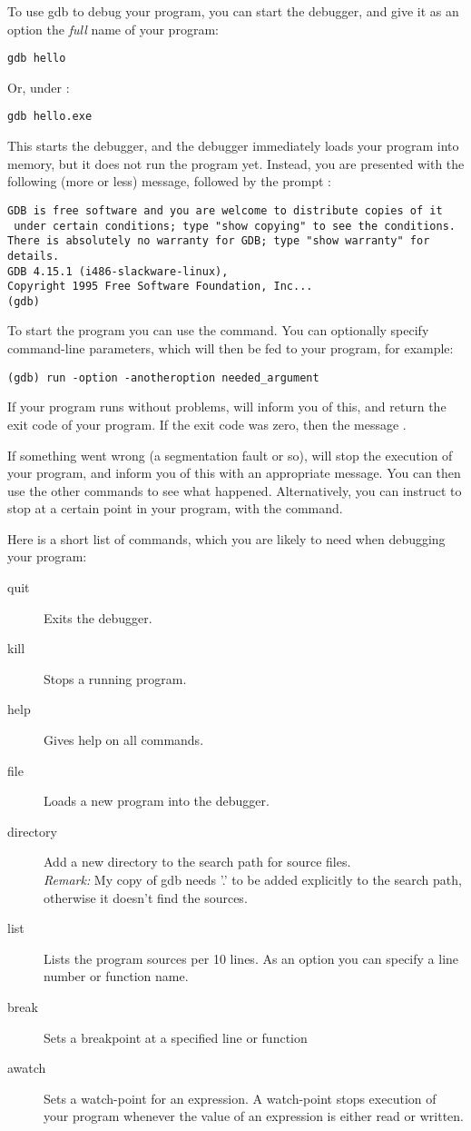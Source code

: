 \documentclass{report}
\begin{document}
To use gdb to debug your program, you can start the debugger, and give it as
an option the {\em full} name of your program:
\begin{verbatim}
gdb hello
\end{verbatim}
Or, under \dos :
\begin{verbatim}
gdb hello.exe
\end{verbatim}

This starts the debugger, and the debugger immediately loads your program
into memory, but it does not run the program yet. Instead, you are presented
with the following (more or less) message, followed by the  prompt
:
\begin{verbatim}
GDB is free software and you are welcome to distribute copies of it
 under certain conditions; type "show copying" to see the conditions.
There is absolutely no warranty for GDB; type "show warranty" for details.
GDB 4.15.1 (i486-slackware-linux),
Copyright 1995 Free Software Foundation, Inc...
(gdb)
\end{verbatim}
To start the program you can use the  command. You can optionally 
specify command-line parameters, which will then be fed to your program, for
example:
\begin{verbatim}
(gdb) run -option -anotheroption needed_argument
\end{verbatim}
If your program runs without problems,  will inform you of this,
and return the exit code of your program. If the exit code was zero, then
the message .

If something went wrong (a segmentation fault or so),  will stop
the execution of your program, and inform you of this with an appropriate
message. You can then use the other  commands to see what happened.  
Alternatively, you can instruct  to stop at a certain point in your
program, with the  command.

Here is a short list of  commands, which you are likely to need when
debugging your program:
\begin{description}
\item [quit\ ] Exits the debugger.
\item [kill\ ] Stops a running program.
\item [help\ ] Gives help on all  commands.
\item [file\ ] Loads a new program into the debugger.
\item [directory\ ] Add a new directory to the search path for source
files.\\
{\em Remark:} My copy of gdb needs '.' to be added explicitly to the search
path, otherwise it doesn't find the sources.
\item [list\ ] Lists the program sources per 10 lines. As an option you can
specify a line number or function name.
\item [break\ ] Sets a breakpoint at a specified line or function
\item [awatch\ ] Sets a watch-point for an expression. A watch-point stops
execution of your program whenever the value of an expression is either 
read or written. 
\end{description}
\end{document}
